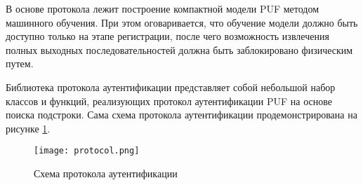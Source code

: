 В основе протокола лежит построение компактной модели PUF методом машинного обучения. При этом оговаривается, что обучение модели должно быть доступно только на этапе регистрации, после чего возможность извлечения полных выходных последовательностей должна быть заблокировано физическим путем.

Библиотека протокола аутентификации представляет собой небольшой набор классов и функций, реализующих протокол аутентификации PUF на основе поиска подстроки. Сама схема протокола аутентификации продемонстрирована на рисунке \ref{fig:architecture:protocol}.

\begin{figure}[!h]
    \centering
    \texttt{[image: protocol.png]}
    \caption{Схема протокола аутентификации}
    \label{fig:architecture:protocol}
\end{figure}

